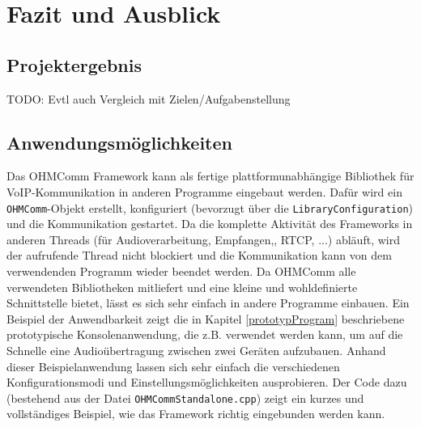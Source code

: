 \chapter{Fazit und Ausblick}
\section{Projektergebnis}
TODO: Evtl auch Vergleich mit Zielen/Aufgabenstellung
\section{Anwendungsmöglichkeiten}
Das OHMComm Framework kann als fertige plattformunabhängige Bibliothek für VoIP-Kommunikation in anderen Programme eingebaut werden. Dafür wird ein \texttt{OHMComm}-Objekt erstellt, konfiguriert (bevorzugt über die \texttt{LibraryConfiguration}) und die Kommunikation gestartet. Da die komplette Aktivität des Frameworks in anderen Threads (für Audioverarbeitung, Empfangen,, RTCP, ...) abläuft, wird der aufrufende Thread nicht blockiert und die Kommunikation kann von dem verwendenden Programm wieder beendet werden. Da OHMComm alle verwendeten Bibliotheken mitliefert und eine kleine und wohldefinierte Schnittstelle bietet, lässt es sich sehr einfach in andere Programme einbauen.
Ein Beispiel der Anwendbarkeit zeigt die in Kapitel \ref{prototypProgram} beschriebene prototypische Konsolenanwendung, die z.B. verwendet werden kann, um auf die Schnelle eine Audioübertragung zwischen zwei Geräten aufzubauen. Anhand dieser Beispielanwendung lassen sich sehr einfach die verschiedenen Konfigurationsmodi und Einstellungsmöglichkeiten ausprobieren. Der Code dazu (bestehend aus der Datei \texttt{OHMCommStandalone.cpp}) zeigt ein kurzes und vollständiges Beispiel, wie das Framework richtig eingebunden werden kann.
